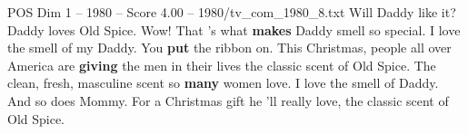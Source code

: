 \begin{textsample}{POS Dim 1 – 1980 – Score 4.00 – 1980/tv\_com\_1980\_8.txt}  \label{ex:f1_pos_049}
Will Daddy like it?
Daddy loves Old Spice.
Wow!
That 's what \textbf{makes} Daddy smell so special.
I love the smell of my Daddy.
You \textbf{put} the ribbon on.
This Christmas, people all over America are \textbf{giving} the men in their lives the classic scent of Old Spice.
The clean, fresh, masculine scent so \textbf{many} women love.
I love the smell of Daddy.
And so does Mommy.
For a Christmas gift he 'll really love, the classic scent of Old Spice.

\end{textsample}
